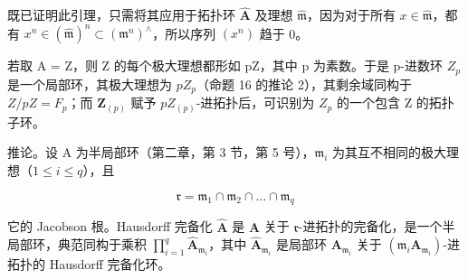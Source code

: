 既已证明此引理，只需将其应用于拓扑环 \(\hat{\mathbf{A}}\) 及理想 \(\hat{\mathfrak{m}}\)，因为对于所有 \(x \in \hat{\mathfrak{m}}\)，都有 \(x^n \in (\hat{\mathfrak{m}})^n \subset (\mathfrak{m}^n)^\wedge\)，所以序列 \((x^n)\) 趋于 0。

若取 A = Z，则 Z 的每个极大理想都形如 pZ，其中 p 为素数。于是 p-进数环 \(Z_{p}\) 是一个局部环，其极大理想为 \(pZ_{p}\)（命题 16 的推论 2），其剩余域同构于 \(Z/pZ = F_{p}\)；而 \(\mathbf{Z}_{(p)}\) 赋予 \(pZ_{(p)}\)-进拓扑后，可识别为 \(Z_{p}\) 的一个包含 Z 的拓扑子环。

推论。设 A 为半局部环（第二章，第 3 节，第 5 号），\(\mathfrak{m}_i\) 为其互不相同的极大理想（\(1 \leqslant i \leqslant q\)），且

\[
\mathfrak {r} = \mathfrak {m} _ {1} \cap \mathfrak {m} _ {2} \cap \dots \cap \mathfrak {m} _ {q}
\]

它的 Jacobson 根。Hausdorff 完备化 \(\hat{\mathbf{A}}\) 是 \(\mathbf{A}\) 关于 \(\mathfrak{r}\)-进拓扑的完备化，是一个半局部环，典范同构于乘积 \(\prod_{i=1}^{q} \hat{\mathbf{A}}_{\mathfrak{m}_i}\)，其中 \(\hat{\mathbf{A}}_{\mathfrak{m}_i}\) 是局部环 \(\mathbf{A}_{\mathfrak{m}_i}\) 关于 \((\mathfrak{m}_i\mathbf{A}_{\mathfrak{m}_i})\)-进拓扑的 Hausdorff 完备化环。

